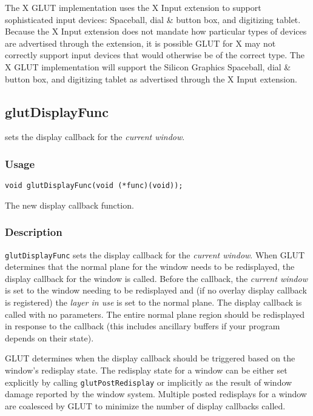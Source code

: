The X GLUT implementation uses the X Input extension \cite{xinput-lib,xinput-protocol}
to support sophisticated input devices:  Spaceball, dial \& button box,
and digitizing tablet.  Because the X Input extension does not
mandate how particular types of devices are advertised through
the extension, it is possible GLUT for X may not
correctly support input devices that would otherwise be of the
correct type.  The X GLUT implementation will support the Silicon
Graphics Spaceball, dial \& button box, and digitizing tablet as
advertised through the X Input extension.

\subsection{glutDisplayFunc}

 sets the display callback for the {\em current window}.

\subsubsection*{Usage}

\begin{verbatim}
void glutDisplayFunc(void (*func)(void));
\end{verbatim}
\begin{description}
\itemsep 0in
\item[{\tt func}]
The new display callback function.
\end{description}

\subsubsection*{Description}

{\tt glutDisplayFunc} sets the display callback for the {\em current
window}.  When GLUT determines that the normal plane for the window needs
to be redisplayed, the display callback for the window is called.  Before the callback,
the {\em current window} is set to the window needing to be
redisplayed and (if no overlay display callback is registered) the {\em layer in use}
is set to the normal plane.  The display callback is called with no parameters.  The
entire normal plane region should be redisplayed in response to the callback (this
includes ancillary buffers if your program depends on their state).

GLUT determines when the display callback should be triggered based on
the window's redisplay state.  The redisplay state for a window can
be either set explicitly by calling {\tt glutPostRedisplay} or implicitly
as the result of window damage reported by the window system.
Multiple posted redisplays for a window are
coalesced by GLUT to minimize the number of display callbacks called.


